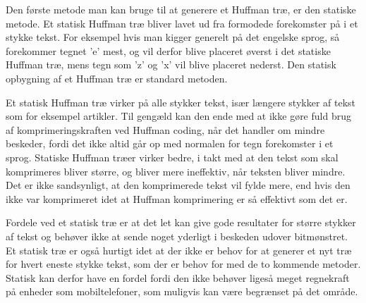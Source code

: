 Den første metode man kan bruge til at generere et Huffman træ, er den statiske metode. Et statisk Huffman træ bliver lavet ud fra formodede forekomster på i et stykke tekst. For eksempel hvis man kigger generelt på det engelske sprog, så forekommer tegnet ’e’ mest, og vil derfor blive placeret øverst i det statiske Huffman træ, mens tegn som ’z’ og ’x’ vil blive placeret nederst. Den statisk opbygning af et Huffman træ er standard metoden\cite{Hufftree_2}.

Et statisk Huffman træ virker på alle stykker tekst, især længere stykker af tekst som for eksempel artikler. Til gengæld kan den ende med at ikke gøre fuld brug af komprimeringskraften ved Huffman coding, når det handler om mindre beskeder, fordi det ikke altid går op med normalen for tegn forekomster i et sprog. Statiske Huffman træer virker bedre, i takt med at den tekst som skal komprimeres bliver større, og bliver mere ineffektiv, når teksten bliver mindre. Det er ikke sandsynligt, at den komprimerede tekst vil fylde mere, end hvis den ikke var komprimeret idet at Huffman komprimering er så effektivt som det er. \cite{Hufftree_3}

Fordele ved et statisk træ er at det let kan give gode resultater for større stykker af tekst og behøver ikke at sende noget yderligt i beskeden udover bitmønstret. Et statisk træ er også hurtigt idet at der ikke er behov for at generer et nyt træ for hvert eneste stykke tekst, som der er behov for med de to kommende metoder. Statisk kan derfor have en fordel fordi den ikke behøver ligeså meget regnekraft på enheder som mobiltelefoner, som muligvis kan være begrænset på det område.
